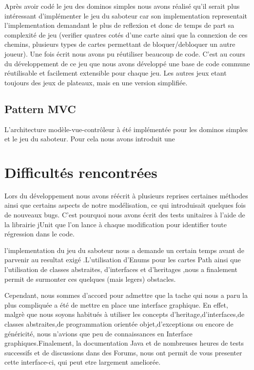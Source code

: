 \documentclass[a4paper, 11pt, DIV=9]{scrartcl}
\begin{document}
Après avoir codé le jeu des dominos simples nous avons réalisé qu'il serait plus
intéressant d'implémenter le jeu du saboteur car son implementation representait l'implementation demandant le plus 
de reflexion et donc de temps de part sa complexité de jeu (verifier quatres cotés d'une carte ainsi que la connexion 
de ces chemins, plusieurs types de cartes permettant de bloquer/debloquer un autre joueur).
Une fois écrit nous avons pu 
réutiliser beaucoup de code. 
C'est au cours du développement de ce jeu que nous
avons développé une base de code commune réutilisable et facilement extensible
pour chaque jeu. Les autres jeux etant toujours des jeux de plateaux, mais en  une version
simplifiée.


\subsection{Pattern MVC}

L'architecture modèle-vue-contrôleur à été implémentée pour les dominos simples
et le jeu du saboteur. Pour cela nous avons introduit une 
\section{Difficultés rencontrées}

Lors du développement nous avons réécrit à plusieurs reprises certaines
méthodes ainsi que certains aspects de notre modélisation,
ce qui introduisait quelques fois de nouveaux bugs. C'est pourquoi
nous avons écrit des tests unitaires à l'aide de la librairie jUnit que l'on lance à
chaque modification pour identifier toute régression dans le code.

l'implementation du jeu du saboteur nous a demande un certain temps avant de parvenir
au resultat exigé .L'utilisation d'Enums pour les cartes Path ainsi que l'utilisation de 
classes abstraites, d'interfaces et d'heritages ,nous a finalement permit de surmonter
ces quelques (mais legers) obstacles.

Cependant, nous sommes d'accord pour admettre que la tache qui nous a paru la plus compliquée a été 
de mettre en place une interface graphique. En effet, malgrè que nous soyons habitués à utiliser les concepts 
d'heritage,d'interfaces,de classes abstraites,de programmation orientée objet,d'exceptions ou encore de généricité, 
nous n'avions que peu de connaissances en Interface graphiques.Finalement, la documentation
Java et de nombreuses heures de tests successifs et de discussions dans des Forums,
nous ont permit de vous presenter cette interface-ci, qui peut etre largement ameliorée.
\end{document}
